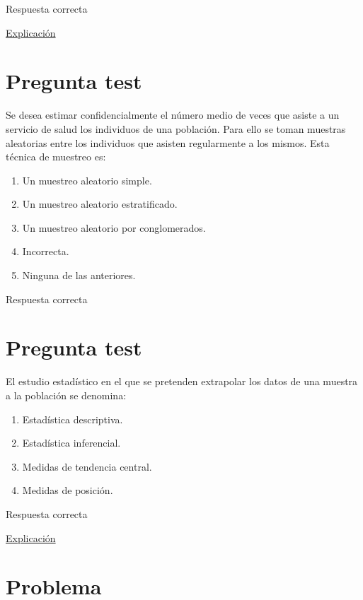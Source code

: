 \documentclass[
]{book}
\providecommand{\tightlist}{%
  \setlength{\itemsep}{0pt}\setlength{\parskip}{0pt}}
\begin{document}
Respuesta correcta

\href{https://es.wikipedia.org/wiki/Estudio_de_cohorte}{Explicación}

\hypertarget{pregunta-test-15}{%
\section{Pregunta test}\label{pregunta-test-15}}

Se desea estimar confidencialmente el número medio de veces que asiste a un servicio de salud los individuos de una población. Para ello se toman muestras aleatorias entre los individuos que asisten regularmente a los mismos. Esta técnica de muestreo es:

\begin{enumerate}
\def\labelenumi{\alph{enumi})}
\tightlist
\item
  Un muestreo aleatorio simple.
\item
  Un muestreo aleatorio estratificado.
\item
  Un muestreo aleatorio por conglomerados.
\item
  Incorrecta.
\item
  Ninguna de las anteriores.
\end{enumerate}

Respuesta correcta

\hypertarget{pregunta-test-16}{%
\section{Pregunta test}\label{pregunta-test-16}}

El estudio estadístico en el que se pretenden extrapolar los datos de una muestra a la población se denomina:

\begin{enumerate}
\def\labelenumi{\alph{enumi})}
\tightlist
\item
  Estadística descriptiva.
\item
  Estadística inferencial.
\item
  Medidas de tendencia central.
\item
  Medidas de posición.
\end{enumerate}

Respuesta correcta

\href{https://1fjmanzano.github.io/bioestadistica/inferencia-estad\%C3\%ADstica.html}{Explicación}

\hypertarget{problema-3}{%
\section{Problema}\label{problema-3}}
\end{document}
